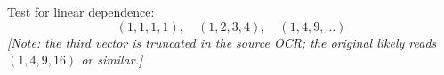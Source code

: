 Test for linear dependence:
$$
(1, 1, 1, 1),\quad (1, 2, 3, 4),\quad (1, 4, 9, \ldots)
$$
\textit{[Note: the third vector is truncated in the source OCR; the original likely reads $(1,4,9,16)$ or similar.]}
